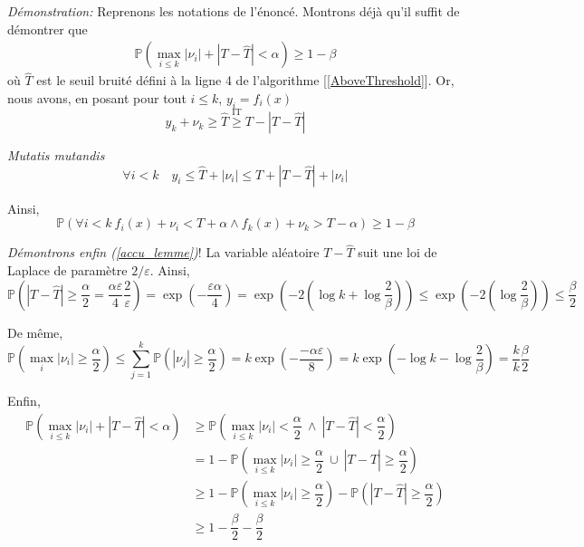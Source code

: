 \textit{Démonstration:} Reprenons les notations de l'énoncé. Montrons déjà qu'il suffit de démontrer que 
\begin{align}
    \label{accu_lemme}
    \mathbb P\left( \max_{i \leq k} |\nu_i| + |T - \hat T| < \alpha  \right)  \geq 1 - \beta   
\end{align}
où \(\hat T\) est le seuil bruité défini à la ligne 4 de l'algorithme [\ref{AboveThreshold}]. Or, nous avons, en posant pour tout \(i \leq k\), \(y_i = f_i(x)\)
\[
    y_k + \nu_k \geq \hat T \overset{\text{IT}}{\geq} T - |T-\hat T|
\]

\textit{Mutatis mutandis} 
\[
    \forall i < k \quad y_i \leq \hat T + |\nu_i| \leq T + |T - \hat T| + |\nu_i|  
\]

Ainsi,
\[
    \mathbb P \left( \forall i < k \  f_i(x) + \nu_i < T + \alpha \wedge f_k(x) + \nu_k > T - \alpha \right) \geq 1 - \beta
\]

\textit{Démontrons enfin (\ref{accu_lemme})}! La variable aléatoire \(T-\hat T\) suit une loi de {\sc Laplace} de paramètre \(2/\varepsilon\). Ainsi,
\[
    \mathbb P \left( |T - \hat T| \geq \dfrac{\alpha}{2} = \dfrac{\alpha \varepsilon}{4}\dfrac{2}{\varepsilon} \right) = \exp\left( -\dfrac{\varepsilon \alpha}{4} \right) = \exp\left( -2\left( \log k + \log \dfrac{2}{\beta} \right) \right) \leq \exp\left( -2\left(\log \dfrac{2}{\beta} \right) \right) \leq \dfrac{\beta}{2}
\]

De même,
\[
    \mathbb P \left( \max_{i} |\nu_i| \geq \dfrac{\alpha}{2} \right) \leq \sum\limits_{j = 1}^k \mathbb P \left( |\nu_j| \geq \dfrac{\alpha}{2} \right) = k \exp\left( -\dfrac{-\alpha\varepsilon}{8} \right) = k \exp\left( -\log k - \log\dfrac{2}{\beta} \right) = \dfrac{k}{k} \dfrac{\beta}{2}
\]

Enfin, 
\begin{align*}
    \mathbb P\left( \max_{i \leq k} |\nu_i| + |T - \hat T| < \alpha  \right) & \geq \mathbb P\left( \max_{i \leq k} |\nu_i| < \dfrac{\alpha}{2} \ \wedge \ |T - \hat T| < \dfrac{\alpha}{2} \right)\\
    & = 1 - \mathbb P\left( \max_{i \leq k} |\nu_i| \geq \dfrac{\alpha}{2} \ \cup \ |T - \hat T| \geq \dfrac{\alpha}{2} \right)\\
    & \geq 1 - \mathbb P\left( \max_{i \leq k} |\nu_i| \geq \dfrac{\alpha}{2}\right) - \mathbb P \left(|T - \hat T| \geq \dfrac{\alpha}{2} \right)\\
    &\geq 1 - \dfrac{\beta}{2} - \dfrac{\beta}{2}
\end{align*}


